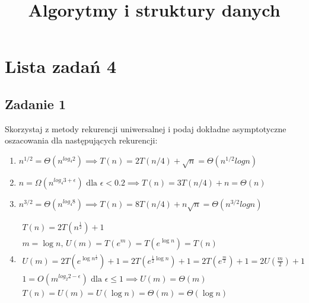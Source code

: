\documentclass{article}
\begin{document}
\title{Algorytmy i struktury danych}
\author{}
\date{}
\maketitle

\section*{Lista zadań 4}

\subsection*{Zadanie 1}
Skorzystaj z metody rekurencji uniwersalnej i podaj dokładne asymptotyczne
oszacowania dla następujących rekurencji:
\begin{enumerate}[label=(\alph*)]
    \item $n^{1/2} = \Theta(n^{log_4 2}) \implies T(n) = 2T(n/4) + \sqrt{n} = \Theta(n^{1/2}logn)$
    \item $n = \Omega(n^{log_4 3+\epsilon}) \text{ dla } \epsilon < 0.2 \implies T(n) = 3T(n/4) + n = \Theta(n)$
    \item $n^{3/2} = \Theta(n^{log_4 8}) \implies T(n) = 8T(n/4) + n\sqrt{n} = \Theta(n^{3/2}logn)$
    \item \begin{gather*}
              T(n) = 2T\left(n^\frac{1}{2}\right) + 1 \\
              m = \log n \text{, } U(m) = T\left(e^m\right) = T\left(e^{\log n}\right) = T(n) \\
              U(m) = 2T\left(e^{\log n^\frac{1}{2}}\right) + 1 = 2T\left(e^{\frac{1}{2}\log n}\right) + 1 = 2T\left(e^{\frac{m}{2}}\right) + 1 = 2U\left(\frac{m}{2}\right) + 1 \\
              1 = O\left(m^{log_2 2-\epsilon}\right) \text{ dla } \epsilon \leq 1 \implies U(m) = \Theta(m) \\
              T(n) = U(m) = U(\log n) = \Theta(m) = \Theta(\log n)
          \end{gather*}
\end{enumerate}
\end{document}
